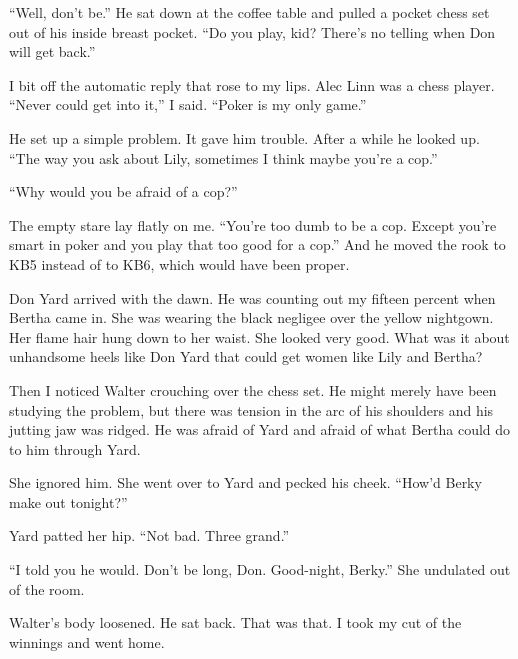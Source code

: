 \documentclass{novel}
\begin{document}
{“Well, don’t be.” He sat down at the coffee table and pulled a pocket chess set out of his inside breast pocket. “Do you play, kid? There’s no telling when Don will get back.”

I bit off the automatic reply that rose to my lips. Alec Linn was a chess player. “Never could get into it,” I said. “Poker is my only game.”

He set up a simple problem. It gave him trouble. After a while he looked up. “The way you ask about Lily, sometimes I think maybe you’re a cop.”

“Why would you be afraid of a cop?”

The empty stare lay flatly on me. “You’re too dumb to be a cop. Except you’re smart in poker and you play that too good for a cop.” And he moved the rook to KB5 instead of to KB6, which would have been proper.

Don Yard arrived with the dawn. He was counting out my fifteen percent when Bertha came in. She was wearing the black negligee over the yellow nightgown. Her flame hair hung down to her waist. She looked very good. What was it about unhandsome heels like Don Yard that could get women like Lily and Bertha?

Then I noticed Walter crouching over the chess set. He might merely have been studying the problem, but there was tension in the arc of his shoulders and his jutting jaw was ridged. He was afraid of Yard and afraid of what Bertha could do to him through Yard.

She ignored him. She went over to Yard and pecked his cheek. “How’d Berky make out tonight?”

Yard patted her hip. “Not bad. Three grand.”

“I told you he would. Don’t be long, Don. Good-night, Berky.” She undulated out of the room.

Walter’s body loosened. He sat back. That was that. I took my cut of the winnings and went home.

}

\vspace{2\nbs}
\clearpage
\thispagestyle{empty}
\end{document}
